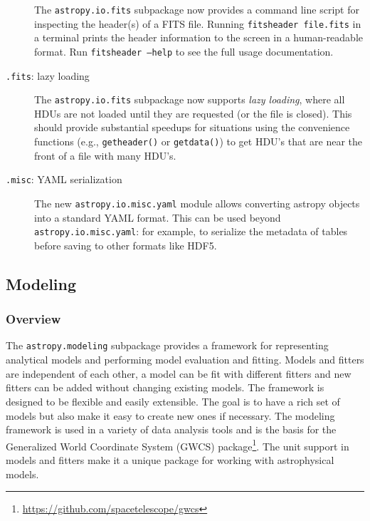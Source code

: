 \documentclass[modern]{aastex61}
\newcommand{\package}[1]{\texttt{#1}\xspace}
\newcommand{\inlinecomment}[2]{\todo[inline]{#1: #2}\xspace}
\begin{document}
\begin{description}
        The \package{astropy.io.fits} subpackage now provides a command line
        script for inspecting the header(s) of a FITS file.  Running
        \texttt{fitsheader file.fits} in a terminal prints the header
        information to the screen in a human-readable format. Run
        \texttt{fitsheader --help} to see the full usage documentation.

    \item [\texttt{.fits}: lazy loading ]

        The \package{astropy.io.fits} subpackage now supports \emph{lazy
        loading}, where all HDUs are not loaded until they are requested (or
        the file is closed). This should provide substantial speedups for
        situations using the convenience functions (e.g., \texttt{getheader()}
        or \texttt{getdata()}) to get HDU’s that are near the front of a file
        with many HDU’s.

    \item [\texttt{.misc}: YAML serialization ]

        The new \package{astropy.io.misc.yaml} module allows converting
        astropy objects into a standard YAML format.
        This can be used beyond \texttt{astropy.io.misc.yaml}: for example, to
        serialize the metadata of tables before saving to other formats like
        HDF5.

\end{description}


\subsection{Modeling}
\label{sec:modeling}
\subsubsection{Overview}
The \package{astropy.modeling} subpackage provides a framework for representing
analytical models and performing model evaluation and fitting. Models and
fitters are independent of each other, a model can be fit with different
fitters and new fitters can be added without changing existing models. The
framework is designed to be flexible and easily extensible. The goal is to have
a rich set of models but also make it easy to create new ones if necessary. The
modeling framework is used in a variety of data analysis tools and is the basis
for the Generalized World Coordinate System (GWCS)
package\footnote{\url{https://github.com/spacetelescope/gwcs}}. The
unit support in models and fitters make it a unique package for working with
astrophysical models.
\end{document}
